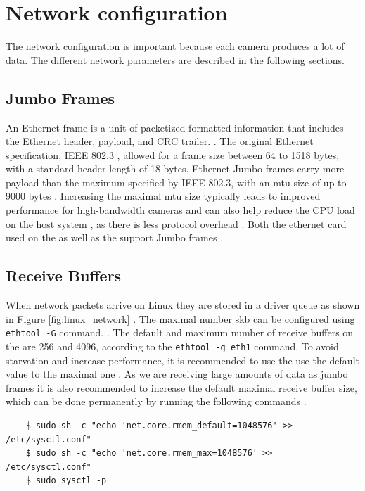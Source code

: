 \section{Network configuration}
The network configuration is important because each camera produces a lot of data.
The different network parameters are described in the following sections.



\subsection{Jumbo Frames}
An Ethernet frame is a unit of packetized formatted information that includes the Ethernet header, payload, and CRC trailer. \cite{winterCisco3ComApplied2009}.
The original Ethernet specification, IEEE 802.3 \cite{ieeeIEEEStandardsInterpretation2002}, allowed for a frame size between 64 to 1518 bytes, with a standard header length of 18 bytes.
Ethernet Jumbo frames carry more payload than the maximum specified by IEEE 802.3, with an \gls{mtu} size of up to 9000 bytes \cite{lucidvisionlabsJumboFramesLUCID2020}.
Increasing the maximal \gls{mtu} size typically leads to improved performance for high-bandwidth cameras and can also help reduce the CPU load on the host system \cite{lucidvisionlabsJumboFramesLUCID2020}, as there is less protocol overhead \cite{lukeThingsYouShould2018}.
Both the ethernet card used on the \jx as well as the \cams support Jumbo frames \cite{IntelI350am4Chipa} \cite{TritonMPPolarized2020a}.

\subsection{Receive Buffers}
When network packets arrive on Linux they are stored in a driver queue as shown in Figure \ref{fig:linux_network} \cite{danQueueingLinuxNetwork2013}.
The maximal number \gls{skb} can be configured using \texttt{ethtool -G} command. \cite{danQueueingLinuxNetwork2013}.
The default and maximum number of receive buffers on the \jx are 256 and 4096, according to the \texttt{ethtool -g eth1} command.
To avoid starvation and increase performance, it is recommended to use the use the default value to the maximal one \cite{lucidvisionlabsReceiveBuffers2020} \cite{danQueueingLinuxNetwork2013}.
As we are receiving large amounts of data as jumbo frames it is also recommended to increase the default maximal receive buffer size, which can be done permanently by running the following commands \cite{lucidvisionlabsReceiveBuffers2020}.
\begin{verbatim}
    $ sudo sh -c "echo 'net.core.rmem_default=1048576' >> /etc/sysctl.conf"
    $ sudo sh -c "echo 'net.core.rmem_max=1048576' >> /etc/sysctl.conf"
    $ sudo sysctl -p
\end{verbatim}


